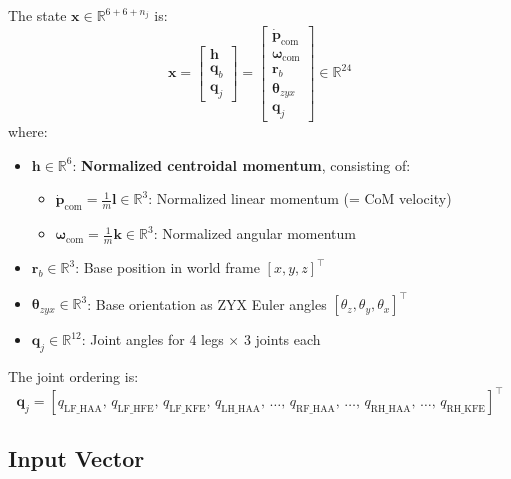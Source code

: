 \documentclass[11pt,a4paper]{article}
\newcommand{\R}{\mathbb{R}}==
\begin{document}
The state $\bm{x} \in \R^{6+6+n_j}$ is:
\begin{equation}
	\bm{x} = \begin{bmatrix} \bm{h} \\ \bm{q}_b \\ \bm{q}_j \end{bmatrix}
	= \begin{bmatrix} \dot{\bm{p}}_{\text{com}} \\ \bm{\omega}_{\text{com}} \\ \bm{r}_b \\ \bm{\theta}_{zyx} \\ \bm{q}_j \end{bmatrix}
	\in \R^{24}
\end{equation}
where:
\begin{itemize}
	\item $\bm{h} \in \R^6$: \textbf{Normalized centroidal momentum}, consisting of:
	      \begin{itemize}
		      \item $\dot{\bm{p}}_{\text{com}} = \frac{1}{m}\bm{l} \in \R^3$: Normalized linear momentum (= CoM velocity)
		      \item $\bm{\omega}_{\text{com}} = \frac{1}{m}\bm{k} \in \R^3$: Normalized angular momentum
	      \end{itemize}
	\item $\bm{r}_b \in \R^3$: Base position in world frame $[x, y, z]^\top$
	\item $\bm{\theta}_{zyx} \in \R^3$: Base orientation as ZYX Euler angles $[\theta_z, \theta_y, \theta_x]^\top$
	\item $\bm{q}_j \in \R^{12}$: Joint angles for 4 legs $\times$ 3 joints each
\end{itemize}

\noindent The joint ordering is:
\begin{equation*}
	\bm{q}_j = [q_{\text{LF\_HAA}},\, q_{\text{LF\_HFE}},\, q_{\text{LF\_KFE}},\,
	q_{\text{LH\_HAA}},\, \ldots,\,
	q_{\text{RF\_HAA}},\, \ldots,\,
	q_{\text{RH\_HAA}},\, \ldots,\, q_{\text{RH\_KFE}}]^\top
\end{equation*}

\subsection{Input Vector}
\end{document}
